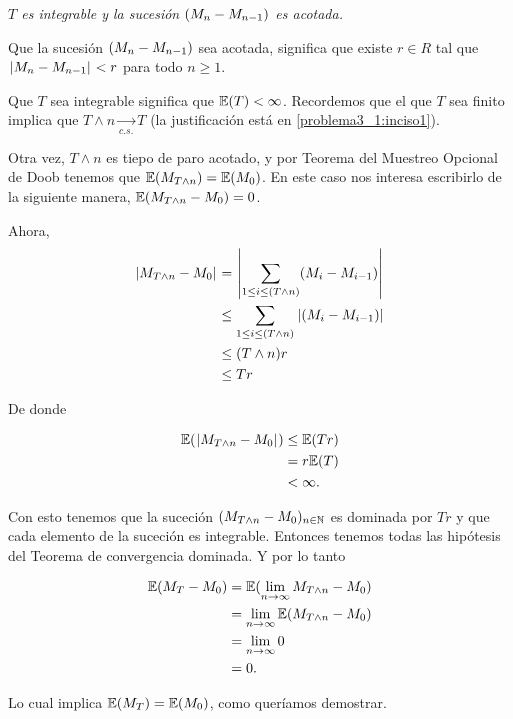 \emph{
    $T$ es integrable y la sucesi\'on $\left( M_n-M_{n-1}\right) $ es acotada.
}

Que la sucesión $\left( M_n-M_{n-1}\right) $ sea acotada, significa que existe $r \in R$ tal que
$\hspace{.25mm}\left|M_n - M_{n-1}\right|\hspace{.25mm} < r$ para todo $n \geq 1$.\par\null

Que $T$ sea integrable significa que $\mathbb{E}(T) < \infty$. Recordemos que el que $T$ sea finito implica que 
$T \wedge n \underset{c.s.}\longrightarrow T$ (la justificación está en \ref{problema3_1:inciso1}). \par\null

Otra vez, $T \wedge n$ es tiepo de paro acotado, y por Teorema del Muestreo Opcional de Doob tenemos que 
$\mathbb{E}(M_{T \wedge n}) = \mathbb{E}(M_0)$. En este caso nos interesa escribirlo de la siguiente manera, 
$\mathbb{E}(M_{T \wedge n} - M_0) = 0$.\par\null

Ahora, 
\begin{align}
    \hspace{.25mm}\left|M_{T \wedge n} - M_0\right|\hspace{.25mm}  &=      \hspace{.25mm}\left|\sum_{1 \leq i \leq (T \wedge n)} (M_i - M_{i-1})\right|\hspace{.25mm}     \\
                                &\leq   \sum_{1 \leq i \leq (T \wedge n)} \hspace{.25mm}\left|(M_i - M_{i-1})\right|\hspace{.25mm}     \\
                                &\leq   (T \wedge n) r                                              \\      
                                &\leq   T r                                                    
\end{align}

De donde 

\begin{align}
        \mathbb{E}(\hspace{.25mm}\left|M_{T \wedge n} - M_0\right|\hspace{.25mm})  &\leq   \mathbb{E}(T r) \\
                                        &= r \mathbb{E}(T)      \\
                                        &< \infty.
\end{align} \par\null

Con esto tenemos que la suceción $(M_{T \wedge n} - M_0)_{n \in \mathbb{N}}$ es dominada por $Tr$ y que cada 
elemento de la suceción es integrable. Entonces tenemos todas las hipótesis del Teorema de convergencia dominada.
Y por lo tanto

\begin{align}
        \mathbb{E}(M_T - M_0)   &=  \mathbb{E}(\lim_{n \rightarrow \infty} M_{T \wedge n} - M_0)        \\
                        &=  \lim_{n \rightarrow \infty} \mathbb{E}(M_{T \wedge n} - M_0)        \\
                        &=  \lim_{n \rightarrow \infty} 0                               \\
                        &=  0.                        
\end{align}\par\null

Lo cual implica $\mathbb{E}(M_T) = \mathbb{E}(M_0)$, como queríamos demostrar.